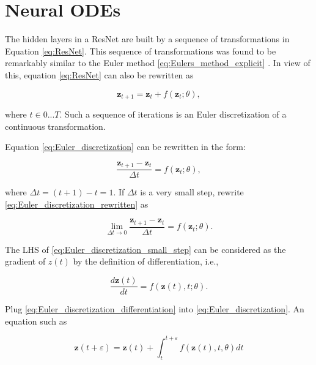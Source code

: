 \documentclass[
	parskip, 			   %
	twoside, 			   %
	DIV=14, 			   %
	BCOR=15.0mm, 		   %
	headsepline, 		   %
	open=right, 		   %
	captions=tableheading, %
	bibliography=totoc,    %
	numbers=noenddot       %
]{scrreprt}
\begin{document}
\section{Neural ODEs}
The hidden layers in a ResNet are built by a sequence of transformations in Equation \ref{eq:ResNet}. This sequence of transformations was found to be remarkably similar to the Euler method \ref{eq:Eulers_method_explicit} \cite{ruthotto2020deep}. In view of this, equation \ref{eq:ResNet} can also be rewritten as

\begin{equation}
    \label{eq:Euler_discretization}
    \mathbf{z}_{t+1} = \mathbf{z}_{t} + f(\mathbf{z}_{t}; \theta),
\end{equation}

where $t \in {0 ... T}$. Such a sequence of iterations is an Euler discretization of a continuous transformation.

Equation \ref{eq:Euler_discretization} can be rewritten in the form:

\begin{equation}
    \label{eq:Euler_discretization_rewritten}
    \frac{\mathbf{z}_{t+1}-\mathbf{z}_{t}}{\Delta t} = f(\mathbf{z}_{t}; \theta),
\end{equation}

where $\Delta t = (t+1)-t = 1$. If $\Delta t$ is a very small step, rewrite \ref{eq:Euler_discretization_rewritten} as

\begin{equation}
    \label{eq:Euler_discretization_small_step}
    \lim_{\Delta t \to 0} \frac{\mathbf{z}_{t+1}-\mathbf{z}_{t}}{\Delta t} = f(\mathbf{z}_{t}; \theta).
\end{equation}

The LHS of \ref{eq:Euler_discretization_small_step} can be considered as the gradient of $z(t)$ by the definition of differentiation, i.e.,

\begin{equation}
    \label{eq:Euler_discretization_differentiation}
    \frac{d\mathbf{z}(t)}{dt} = f(\mathbf{z}(t), t; \theta).
\end{equation}

Plug \ref{eq:Euler_discretization_differentiation} into \ref{eq:Euler_discretization}. An equation such as 

\begin{equation}
    \label{eq:Neural_ODE}
    \mathbf{z}(t+\varepsilon ) = \mathbf{z}(t) + \int_{t}^{t+\varepsilon } f(\mathbf{z}(t), t, \theta)dt
\end{equation}
\end{document}
